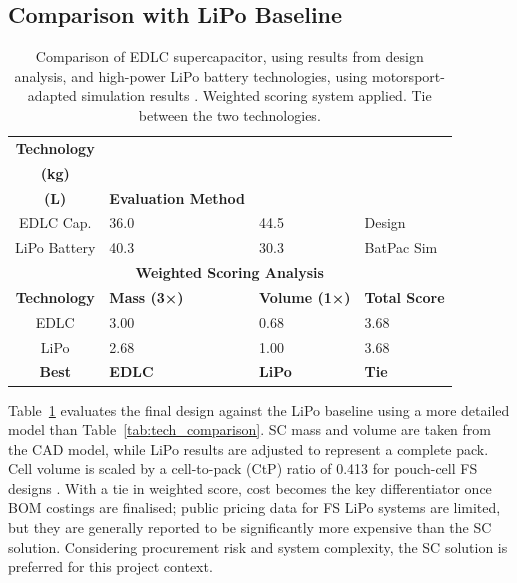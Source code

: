 \documentclass[11pt, a4paper]{report}
\numberwithin{equation}{section}
\begin{document}
\begin{refsection}
\subsection{Comparison with LiPo Baseline}

\begin{table}[htbp]
    \centering
    \caption{Comparison of EDLC supercapacitor, using results from design analysis, and high-power LiPo battery technologies, using motorsport-adapted simulation results \cite{batpac2022manual}. Weighted scoring system applied. Tie between the two technologies.}
    \label{tab:results_comparison}
    \footnotesize
    \begin{tabular}{|c|l|l|l|}
        \hline
        \textbf{Technology} & \makecell{\textbf{Mass} \\ \textbf{(kg)}} & \makecell{\textbf{Volume} \\ \textbf{(L)}} & \textbf{Evaluation Method} \\
        \hline
        EDLC Cap. & 36.0 & 44.5 & Design \\
        \arrayrulecolor{gray!30}\hline\arrayrulecolor{black}
        LiPo Battery & 40.3 & 30.3 & BatPac Sim \\
        \hline
        \hline
        \multicolumn{4}{|c|}{\textbf{Weighted Scoring Analysis}} \\
        \hline
        \textbf{Technology} & \textbf{Mass (3×)} & \textbf{Volume (1×)} & \textbf{Total Score} \\
        \hline
        EDLC & 3.00 & 0.68 & 3.68 \\
        \arrayrulecolor{gray!30}\hline\arrayrulecolor{black}
        LiPo & 2.68 & 1.00 & 3.68 \\
        \hline
        \textbf{Best} & \textbf{EDLC} & \textbf{LiPo} & \cellcolor{orange!20}\textbf{Tie} \\
        \hline
    \end{tabular}
\end{table}

Table~\ref{tab:results_comparison} evaluates the final design against the LiPo baseline using a more detailed model than Table~\ref{tab:tech_comparison}. SC mass and volume are taken from the CAD model, while LiPo results are adjusted to represent a complete pack. Cell volume is scaled by a cell-to-pack (CtP) ratio of 0.413 for pouch-cell FS designs \cite{epp_multiphysical_battery}. With a tie in weighted score, cost becomes the key differentiator once BOM costings are finalised; public pricing data for FS LiPo systems are limited, but they are generally reported to be significantly more expensive than the SC solution. Considering procurement risk and system complexity, the SC solution is preferred for this project context.


\end{refsection}
\end{document}
